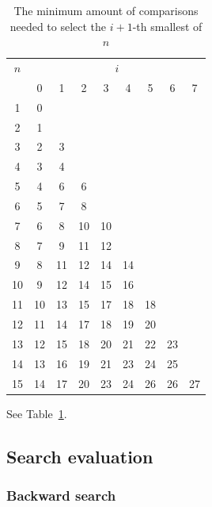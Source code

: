 \documentclass[10pt,journal,compsoc]{IEEEtran}
\begin{document}
\begin{table}
  \centering
  \begin{tabular}{c|cccccccc}
    $n$ & \multicolumn{8}{c}{$i$}                                    \\
        & 0                       & 1  & 2  & 3  & 4  & 5  & 6  & 7  \\ \hline
    1   & 0                                                          \\
    2   & 1                                                          \\
    3   & 2                       & 3                                \\
    4   & 3                       & 4                                \\
    5   & 4                       & 6  & 6                           \\
    6   & 5                       & 7  & 8                           \\
    7   & 6                       & 8  & 10 & 10                     \\
    8   & 7                       & 9  & 11 & 12                     \\
    9   & 8                       & 11 & 12 & 14 & 14                \\
    10  & 9                       & 12 & 14 & 15 & 16                \\
    11  & 10                      & 13 & 15 & 17 & 18 & 18           \\
    12  & 11                      & 14 & 17 & 18 & 19 & 20           \\
    13  & 12                      & 15 & 18 & 20 & 21 & 22 & 23      \\
    14  & 13                      & 16 & 19 & 21 & 23 & 24 & 25      \\
    15  & 14                      & 17 & 20 & 23 & 24 & 26 & 26 & 27 \\
  \end{tabular}
  \caption{The minimum amount of comparisons needed to select the $i+1$-th smallest of $n$}
  \label{table:num-comparisons}
\end{table}

See Table~\ref{table:num-comparisons}.


\subsection{Search evaluation}
\subsubsection{Backward search}
\end{document}
